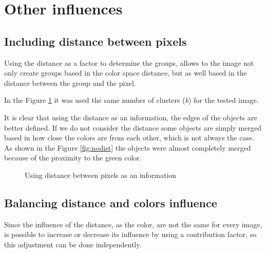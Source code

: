 \documentclass{article}
\begin{document}
\section{Other influences}

\subsection{Including distance between pixels}

Using the distance as a factor to determine the groups, allows to the image not only create groups based in the color space distance, but as well based in the distance between the group and the pixel. 

In the Figure \ref{fig:distance} it was used the same number of clusters (\emph{k}) for the tested image.

It is clear that using the distance as an information, the edges of the objects are better defined. If we do not consider the distance some objects are simply merged based in how close the colors are from each other, which is not always the case. As shown in the Figure \ref{fig:nodist} the objects were almost completely merged because of the proximity to the green color.


\begin{figure}[H]
	\centering
	\hspace{0.1cm}
	\hspace{0.1cm}
	\caption{Using distance between pixels as an information}
	\label{fig:distance}
\end{figure}


\subsection{Balancing distance and colors influence}

Since the influence of the distance, as the color, are not the same for every image, is possible to increase or decrease its influence by using a contribution factor, so this adjustment can be done independently.
\end{document}
